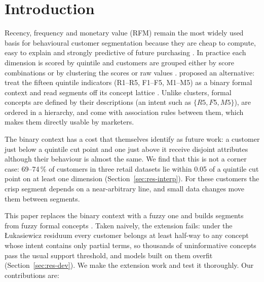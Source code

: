 \section{Introduction}\label{sec:intro}

Recency, frequency and monetary value (RFM) remain the most widely used basis for behavioural customer segmentation because they are cheap to compute, easy to explain and strongly predictive of future purchasing \citep{hughes1994,fader2005}. In practice each dimension is scored by quintile and customers are grouped either by score combinations or by clustering the scores or raw values \citep{chen2012,wedel2000}. \citet{rungruang2024} proposed an alternative: treat the fifteen quintile indicators (R1--R5, F1--F5, M1--M5) as a binary formal context and read segments off its concept lattice \citep{ganter1999}. Unlike clusters, formal concepts are defined by their descriptions (an intent such as $\{R5, F5, M5\}$), are ordered in a hierarchy, and come with association rules between them, which makes them directly usable by marketers.

The binary context has a cost that \citet{rungruang2024} themselves identify as future work: a customer just below a quintile cut point and one just above it receive disjoint attributes although their behaviour is almost the same. We find that this is not a corner case: 69--74\,\% of customers in three retail datasets lie within 0.05 of a quintile cut point on at least one dimension (Section~\ref{sec:res-interp}). For these customers the crisp segment depends on a near-arbitrary line, and small data changes move them between segments.

This paper replaces the binary context with a fuzzy one and builds segments from fuzzy formal concepts \citep{belohlavek2002,belohlavek2004}. Taken naively, the extension fails: under the Łukasiewicz residuum every customer belongs at least half-way to any concept whose intent contains only partial terms, so thousands of uninformative concepts pass the usual support threshold, and models built on them overfit (Section~\ref{sec:res-dev}). We make the extension work and test it thoroughly. Our contributions are:

